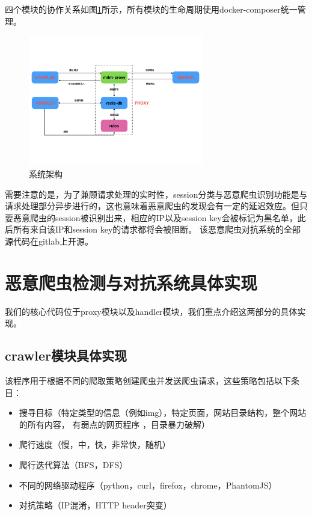 \documentclass[doctor,privacy,twoside]{buaa_mac}
\begin{document}
四个模块的协作关系如图\ref{fig:architecture}所示，所有模块的生命周期使用docker-composer统一管理。

\begin{figure}[!h]
  \centering
  \includegraphics[width=0.68\textwidth]{images/architecture.png}
  \caption{系统架构}
  \label{fig:architecture}
\end{figure}
\centerline{}

需要注意的是，为了兼顾请求处理的实时性，session分类与恶意爬虫识别功能是与请求处理部分异步进行的，这也意味着恶意爬虫的发现会有一定的延迟效应。但只要恶意爬虫的session被识别出来，相应的IP以及session key会被标记为黑名单，此后所有来自该IP和session key的请求都将会被阻断。
该恶意爬虫对抗系统的全部源代码在gitlab上开源。



\section{恶意爬虫检测与对抗系统具体实现}
我们的核心代码位于proxy模块以及handler模块，我们重点介绍这两部分的具体实现。

\subsection{crawler模块具体实现}
该程序用于根据不同的爬取策略创建爬虫并发送爬虫请求，这些策略包括以下条目：

\begin{itemize}
\item[(1)] 搜寻目标（特定类型的信息（例如img），特定页面，网站目录结构，整个网站的所有内容， 有弱点的网页程序 ，目录暴力破解）
\item[(2)] 爬行速度（慢，中，快，非常快，随机）
\item[(3)] 爬行迭代算法（BFS，DFS）
\item[(4)] 不同的网络驱动程序（python，curl，firefox，chrome，PhantomJS）
\item[(5)] 对抗策略（IP混淆，HTTP header突变）
\end {itemize}
\end{document}
